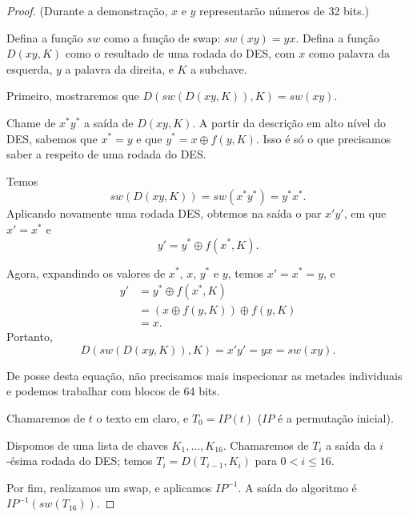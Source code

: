 \documentclass{article}
\newcommand{\sw}{\mathit{sw}}
\newcommand{\IP}{\mathit{IP}}
\begin{document}
\begin{proof}

    (Durante a demonstração, $x$ e $y$
    representarão números de 32 bits.)

    Defina a função $\sw$ como a função de swap:
    $\sw(xy) = yx$.
    Defina a função $D(xy, K)$ como o resultado de uma rodada do DES,
    com $x$ como palavra da esquerda, $y$ a palavra da direita,
    e $K$ a subchave.

    Primeiro, mostraremos que $D(\sw(D(xy, K)), K) = \sw(xy)$.

    Chame de $x^*y^*$ a saída de $D(xy, K)$.
    A partir da descrição em alto nível do DES,
    sabemos que $x^* = y$
    e que $y^* = x \oplus f(y, K)$.
    Isso é só o que precisamos saber a respeito de uma rodada do DES.

    Temos
    \begin{equation*}
        \sw(D(xy, K)) = \sw(x^*y^*) = y^*x^*.
    \end{equation*}
    Aplicando novamente uma rodada DES,
    obtemos na saída o par $x'y'$,
    em que $x' = x^*$
    e
    \begin{equation*}
        y' = y^* \oplus f(x^*, K).
    \end{equation*}

    Agora, expandindo os valores de $x^*$, $x$, $y^*$ e $y$,
    temos $x' = x^* = y$,
    e
    \begin{align*}
        y'  &= y^* \oplus f(x^*, K) \\
            &= (x \oplus f(y, K)) \oplus f(y, K) \\
            &= x.
    \end{align*}
    Portanto,
    \begin{equation}
        D(\sw(D(xy, K)), K) = x'y' = yx = \sw(xy).
        \label{dsw}
    \end{equation}

    De posse desta equação,
    não precisamos mais inspecionar as metades individuais
    e podemos trabalhar com blocos de 64 bits.

    Chamaremos de $t$ o texto em claro, e $T_0 = \IP(t)$
    ($\IP$ é a permutação inicial).

    Dispomos de uma lista de chaves $K_1, \dots, K_{16}$.
    Chamaremos de $T_i$ a saída da $i$-ésima rodada do DES;
    temos $T_i = D(T_{i-1}, K_i)$ para $0 < i \leq 16$.

    Por fim, realizamos um swap, e aplicamos $\IP^{-1}$.
    A saída do algoritmo é $\IP^{-1}(\sw(T_{16}))$.


\end{proof}
\end{document}
